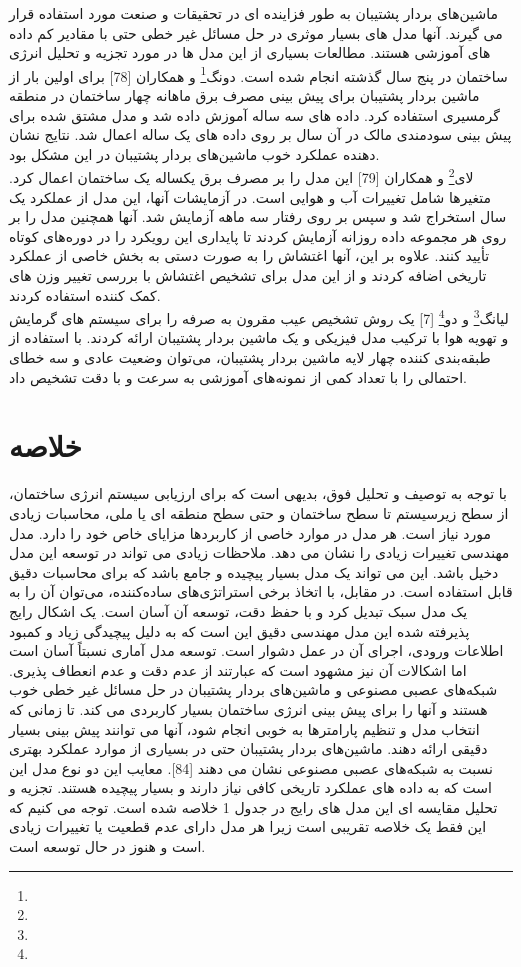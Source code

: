 ماشین‌های بردار پشتیبان به طور فزاینده ای در تحقیقات و صنعت مورد استفاده قرار می گیرند. آنها مدل های بسیار موثری در حل مسائل غیر خطی حتی با مقادیر کم داده های آموزشی هستند. مطالعات بسیاری از این مدل ها در مورد تجزیه و تحلیل انرژی ساختمان در پنج سال گذشته انجام شده است.
دونگ\footnote{} و همکاران [78] برای اولین بار از ماشین بردار پشتیبان برای پیش بینی مصرف برق ماهانه چهار ساختمان در منطقه گرمسیری استفاده کرد. داده های سه ساله آموزش داده شد و مدل مشتق شده برای پیش بینی سودمندی مالک در آن سال بر روی داده های یک ساله اعمال شد. نتایج نشان دهنده عملکرد خوب ماشین‌های بردار پشتیبان در این مشکل بود.
\\
لای\footnote{} و همکاران [79] این مدل را بر مصرف برق یکساله یک ساختمان اعمال کرد. متغیرها شامل تغییرات آب و هوایی است. در آزمایشات آنها، این مدل از عملکرد یک سال استخراج شد و سپس بر روی رفتار سه ماهه آزمایش شد. آنها همچنین مدل را بر روی هر مجموعه داده روزانه آزمایش کردند تا پایداری این رویکرد را در دوره‌های کوتاه تأیید کنند. علاوه بر این، آنها اغتشاش را به صورت دستی به بخش خاصی از عملکرد تاریخی اضافه کردند و از این مدل برای تشخیص اغتشاش با بررسی تغییر وزن های کمک کننده استفاده کردند.
\\
لیانگ\footnote{} و دو\footnote{} [7] یک روش تشخیص عیب مقرون به صرفه را برای سیستم های گرمایش و تهویه هوا با ترکیب مدل فیزیکی و یک ماشین بردار پشتیبان ارائه کردند. با استفاده از طبقه‌بندی کننده چهار لایه ماشین بردار پشتیبان، می‌توان وضعیت عادی و سه خطای احتمالی را با تعداد کمی از نمونه‌های آموزشی به سرعت و با دقت تشخیص داد.


\section{خلاصه}

با توجه به توصیف و تحلیل فوق، بدیهی است که برای ارزیابی سیستم انرژی ساختمان، از سطح زیرسیستم تا سطح ساختمان و حتی سطح منطقه ای یا ملی، محاسبات زیادی مورد نیاز است. هر مدل در موارد خاصی از کاربردها مزایای خاص خود را دارد. مدل مهندسی تغییرات زیادی را نشان می دهد. ملاحظات زیادی می تواند در توسعه این مدل دخیل باشد. این می تواند یک مدل بسیار پیچیده و جامع باشد که برای محاسبات دقیق قابل استفاده است. در مقابل، با اتخاذ برخی استراتژی‌های ساده‌کننده، می‌توان آن را به یک مدل سبک تبدیل کرد و با حفظ دقت، توسعه آن آسان است. یک اشکال رایج پذیرفته شده این مدل مهندسی دقیق این است که به دلیل پیچیدگی زیاد و کمبود اطلاعات ورودی، اجرای آن در عمل دشوار است. توسعه مدل آماری نسبتاً آسان است اما اشکالات آن نیز مشهود است که عبارتند از عدم دقت و عدم انعطاف پذیری. شبکه‌های عصبی مصنوعی و ماشین‌های بردار پشتیبان در حل مسائل غیر خطی خوب هستند و آنها را برای پیش بینی انرژی ساختمان بسیار کاربردی می کند. تا زمانی که انتخاب مدل و تنظیم پارامترها به خوبی انجام شود، آنها می توانند پیش بینی بسیار دقیقی ارائه دهند. ماشین‌های بردار پشتیبان حتی در بسیاری از موارد عملکرد بهتری نسبت به شبکه‌های عصبی مصنوعی نشان می دهند [84]. معایب این دو نوع مدل این است که به داده های عملکرد تاریخی کافی نیاز دارند و بسیار پیچیده هستند. تجزیه و تحلیل مقایسه ای این مدل های رایج در جدول 1 خلاصه شده است. توجه می کنیم که این فقط یک خلاصه تقریبی است زیرا هر مدل دارای عدم قطعیت یا تغییرات زیادی است و هنوز در حال توسعه است.